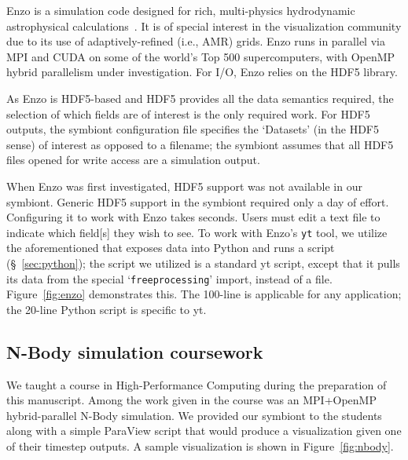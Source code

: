 Enzo is a simulation code designed for rich, multi-physics hydrodynamic
astrophysical calculations~\cite{Enzo:2013}.  It is of special interest
in the visualization community due to its use of adaptively-refined
(i.e., AMR) grids.  Enzo runs in parallel via MPI and CUDA on some of
the world's Top 500 supercomputers, with OpenMP hybrid parallelism
under investigation.  For I/O, Enzo relies on the HDF5 library.

As Enzo is HDF5-based and HDF5 provides all the data semantics
required, the selection of which fields are of interest is the only
required work.  For HDF5 outputs, the symbiont configuration file
specifies the `Datasets' (in the HDF5 sense) of interest as opposed to
a filename; the symbiont assumes that all HDF5 files opened for write
access are a simulation output.

When Enzo was first investigated, HDF5 support was not available in our
symbiont.  Generic HDF5 support in the symbiont required only a day of
effort.  Configuring it to work with Enzo takes seconds. Users must
edit a text file to indicate which field[s] they wish to see.  To work
with
Enzo's \texttt{yt} tool, we utilize the aforementioned
\freeprocessor{} that exposes data into Python and runs a script
(\S~\ref{sec:python}); the script we utilized is a standard yt script,
except that it
pulls its data from the special `\texttt{freeprocessing}' import,
instead of a file.  Figure~\ref{fig:enzo} demonstrates this.  The
100-line \freeprocessor{} is applicable for any \insitu{} application;
the 20-line Python script is specific to yt.

%

\subsection{N-Body simulation coursework}

We taught a course in High-Performance Computing during the preparation
of this manuscript.  Among the work given in the course was an
MPI+OpenMP hybrid-parallel N-Body simulation.  We provided our symbiont
to the students along with a simple ParaView script that would produce
a visualization given one of their timestep outputs.  A sample
visualization is
shown in Figure~\ref{fig:nbody}.

